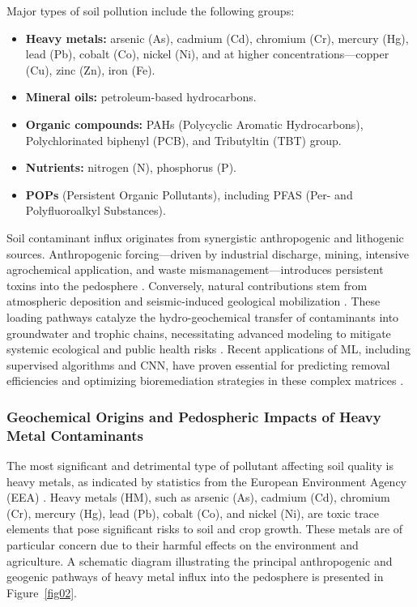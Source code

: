 \documentclass[sn-mathphys-num]{sn-jnl}
\begin{document}
Major types of soil pollution include the following groups:

\begin{itemize}
    \item \textbf{Heavy metals:} arsenic (As), cadmium (Cd), chromium (Cr),
        mercury (Hg), lead (Pb), cobalt (Co), nickel (Ni), and at higher
        concentrations---copper (Cu), zinc (Zn), iron (Fe).
    \item \textbf{Mineral oils:} petroleum-based hydrocarbons.
    \item \textbf{Organic compounds:} PAHs (Polycyclic Aromatic
        Hydrocarbons), Polychlorinated biphenyl (PCB), and Tributyltin (TBT)
        group.
    \item \textbf{Nutrients:} nitrogen (N), phosphorus (P).
    \item \textbf{POPs} (Persistent Organic Pollutants), including PFAS
        (Per- and Polyfluoroalkyl Substances).
\end{itemize}

Soil contaminant influx originates from synergistic anthropogenic and
lithogenic sources. Anthropogenic forcing---driven by industrial discharge,
mining, intensive agrochemical application, and waste mismanagement---introduces
persistent toxins into the pedosphere \cite{Bwandamuka2025,Latif2026}.
Conversely, natural contributions stem from atmospheric deposition and
seismic-induced geological mobilization \cite{Binetti2026,Latif2026}. These
loading pathways catalyze the hydro-geochemical transfer of contaminants into
groundwater and trophic chains, necessitating advanced modeling to mitigate
systemic ecological and public health risks
\cite{Elmotawakkil2025,Sanad2026}. Recent applications of ML, including
supervised algorithms and CNN, have proven essential for predicting removal
efficiencies and optimizing bioremediation strategies in these complex matrices
\cite{Okafor2026,Pace2026}.

\subsubsection{Geochemical Origins and Pedospheric Impacts of Heavy Metal
    Contaminants}\label{sec2.1.1}

The most significant and detrimental type of pollutant affecting soil quality
is heavy metals, as indicated by statistics from the European Environment
Agency (EEA) \cite{EEA2009}. Heavy metals (HM), such as arsenic (As),
cadmium (Cd), chromium (Cr), mercury (Hg), lead (Pb), cobalt (Co), and
nickel (Ni), are toxic trace elements that pose significant risks to soil and
crop growth. These metals are of particular concern due to their harmful
effects on the environment and agriculture. A schematic diagram illustrating
the principal anthropogenic and geogenic pathways of heavy metal influx into
the pedosphere is presented in Figure~\ref{fig02}.
\end{document}
